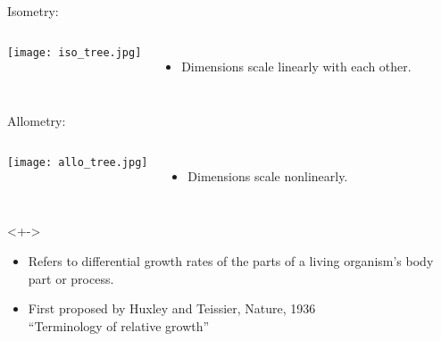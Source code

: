 \begin{frame}
  \small

  \begin{block}{Isometry:}
    \begin{columns}
      \texttt{[image: iso\_tree.jpg]}
      \begin{itemize}
      \item 
        Dimensions scale linearly with each other.
      \end{itemize}
    \end{columns}
  \end{block}

  \begin{block}{Allometry:}
    \begin{columns}
      \texttt{[image: allo\_tree.jpg]}\\
      \begin{itemize}
      \item 
        Dimensions scale nonlinearly.
      \end{itemize}
    \end{columns}
  \end{block}

  \begin{block}<+->{}
    \begin{itemize}
    \item<+-> 
      Refers to differential growth rates of the parts
      of a living organism's body part or process.
    \item<+-> 
      First proposed by Huxley and Teissier, Nature, 1936\\
      ``Terminology of relative growth''\cite{huxley1936a,shingleton2010a}
    \end{itemize}
  \end{block}

\end{frame}

